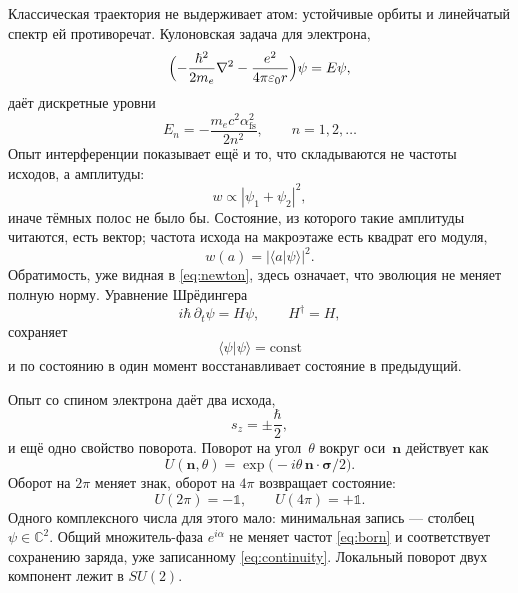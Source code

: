 Классическая траектория не выдерживает атом:
устойчивые орбиты и линейчатый спектр ей противоречат.
Кулоновская задача для электрона,
\begin{equation}
  \Bigl(-\frac{\hbar^2}{2m_e}\nabla^2 - \frac{e^2}{4\pi\varepsilon_0 r}\Bigr)\psi = E\psi,
  \label{eq:hydrogen}
\end{equation}
даёт дискретные уровни
\begin{equation}
  E_n = -\frac{m_e c^2\alpha_{\mathrm{fs}}^2}{2n^2},
  \qquad n=1,2,\ldots
  \label{eq:rydberg}
\end{equation}
Опыт интерференции показывает ещё и то, что складываются не частоты исходов, а амплитуды:
\begin{equation}
  w \propto |\psi_1+\psi_2|^2,
  \label{eq:interference}
\end{equation}
иначе тёмных полос не было бы.
Состояние, из которого такие амплитуды читаются, есть вектор;
частота исхода на макроэтаже есть квадрат его модуля,
\begin{equation}
  w(a) = |\langle a|\psi\rangle|^2.
  \label{eq:born}
\end{equation}
Обратимость, уже видная в \eqref{eq:newton}, здесь означает,
что эволюция не меняет полную норму.
Уравнение Шрёдингера
\begin{equation}
  i\hbar\,\partial_t\psi = H\psi,
  \qquad H^\dagger = H,
  \label{eq:schrodinger}
\end{equation}
сохраняет
\begin{equation}
  \langle\psi|\psi\rangle = \mathrm{const}
  \label{eq:norm}
\end{equation}
и по состоянию в один момент восстанавливает состояние в предыдущий.

Опыт со спином электрона даёт два исхода,
\begin{equation}
  s_z = \pm\frac{\hbar}{2},
  \label{eq:spin-z}
\end{equation}
и ещё одно свойство поворота.
Поворот на угол~$\theta$ вокруг оси~$\mathbf{n}$ действует как
\begin{equation}
  U(\mathbf{n},\theta)
  = \exp\bigl(-i\theta\,\mathbf{n}\cdot\boldsymbol{\sigma}/2\bigr).
  \label{eq:spin-rotation}
\end{equation}
Оборот на $2\pi$ меняет знак, оборот на $4\pi$ возвращает состояние:
\begin{equation}
  U(2\pi)=-\mathbb{1},
  \qquad
  U(4\pi)=+\mathbb{1}.
  \label{eq:spin-4pi}
\end{equation}
Одного комплексного числа для этого мало: минимальная запись --- столбец $\psi\in\mathbb{C}^2$.
Общий множитель-фаза $e^{i\alpha}$ не меняет частот \eqref{eq:born}
и соответствует сохранению заряда, уже записанному \eqref{eq:continuity}.
Локальный поворот двух компонент лежит в $SU(2)$.

